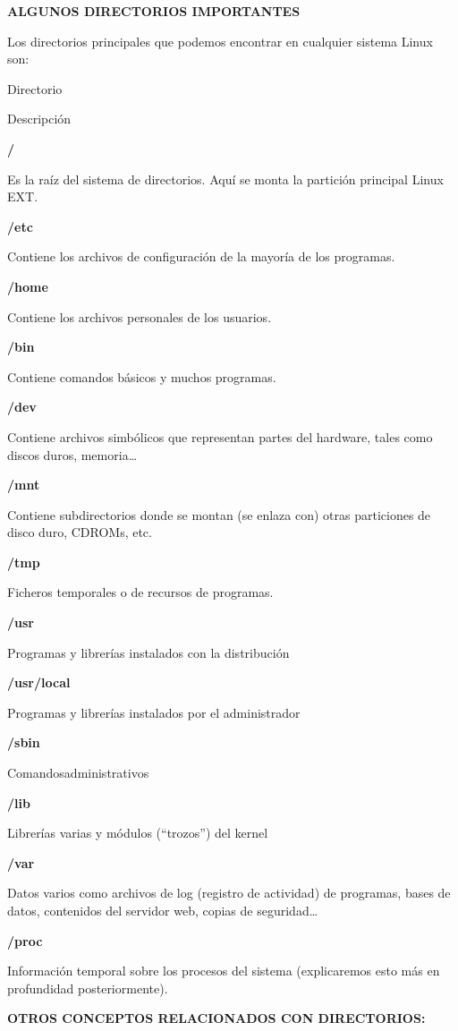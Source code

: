 \documentclass[
  jou,
  floatsintext,
  longtable,
  a4paper,
  nolmodern,
  notxfonts,
  notimes,
  12pt,
  colorlinks=true,linkcolor=blue,citecolor=blue,urlcolor=blue]{apa7}
\begin{document}
\textbf{ALGUNOS DIRECTORIOS IMPORTANTES}

Los directorios principales que podemos encontrar en cualquier sistema
Linux son:

Directorio

Descripción

\textbf{/}

Es la raíz del sistema de directorios. Aquí se monta la partición
principal Linux EXT.

\textbf{/etc}

Contiene los archivos de configuración de la mayoría de los programas.

\textbf{/home}

Contiene los archivos personales de los usuarios.

\textbf{/bin}

Contiene comandos básicos y muchos programas.

\textbf{/dev}

Contiene archivos simbólicos que representan partes del hardware, tales
como discos duros, memoria\ldots{}

\textbf{/mnt}

Contiene subdirectorios donde se montan (se enlaza con) otras
particiones de disco duro, CDROMs, etc.

\textbf{/tmp}

Ficheros temporales o de recursos de programas.

\textbf{/usr}

Programas y librerías instalados con la distribución

\textbf{/usr/local}

Programas y librerías instalados por el administrador

\textbf{/sbin}

Comandosadministrativos

\textbf{/lib}

Librerías varias y módulos (``trozos'') del kernel

\textbf{/var}

Datos varios como archivos de log (registro de actividad) de programas,
bases de datos, contenidos del servidor web, copias de seguridad\ldots{}

\textbf{/proc}

Información temporal sobre los procesos del sistema (explicaremos esto
más en profundidad posteriormente).

\textbf{OTROS CONCEPTOS RELACIONADOS CON DIRECTORIOS:}
\end{document}
